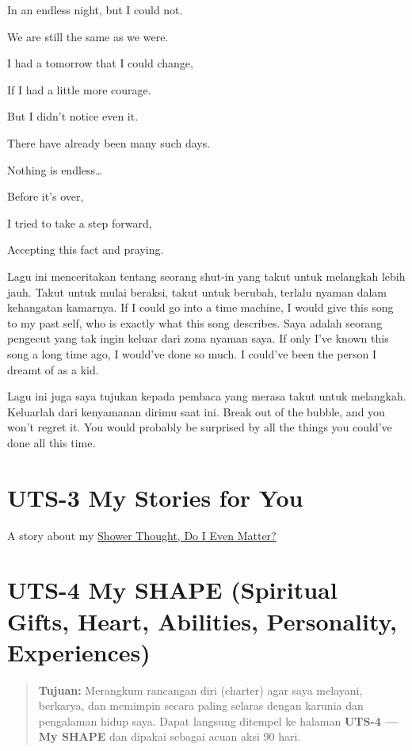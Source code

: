 \documentclass[
  letterpaper,
  DIV=11,
  numbers=noendperiod]{scrreprt}
\begin{document}
In an endless night, but I could not.

We are still the same as we were.

I had a tomorrow that I could change,

If I had a little more courage.

But I didn't notice even it.

There have already been many such days.

Nothing is endless\ldots{}

Before it's over,

I tried to take a step forward,

Accepting this fact and praying.

Lagu ini menceritakan tentang seorang shut-in yang takut untuk melangkah
lebih jauh. Takut untuk mulai beraksi, takut untuk berubah, terlalu
nyaman dalam kehangatan kamarnya. If I could go into a time machine, I
would give this song to my past self, who is exactly what this song
describes. Saya adalah seorang pengecut yang tak ingin keluar dari zona
nyaman saya. If only I've known this song a long time ago, I would've
done so much. I could've been the person I dreamt of as a kid.

Lagu ini juga saya tujukan kepada pembaca yang merasa takut untuk
melangkah. Keluarlah dari kenyamanan dirimu saat ini. Break out of the
bubble, and you won't regret it. You would probably be surprised by all
the things you could've done all this time.


\chapter{UTS-3 My Stories for You}\label{uts-3-my-stories-for-you}

A story about my
\href{https://medium.com/@rafipeen/do-i-even-matter-a-shower-thought-1041949245b0}{Shower
Thought, Do I Even Matter?}


\chapter{UTS-4 My SHAPE (Spiritual Gifts, Heart, Abilities, Personality,
Experiences)}\label{uts-4-my-shape-spiritual-gifts-heart-abilities-personality-experiences}

\begin{quote}
\textbf{Tujuan:} Merangkum rancangan diri (charter) agar saya melayani,
berkarya, dan memimpin secara paling selaras dengan karunia dan
pengalaman hidup saya. Dapat langsung ditempel ke halaman \textbf{UTS-4
--- My SHAPE} dan dipakai sebagai acuan aksi 90 hari.
\end{quote}
\end{document}

